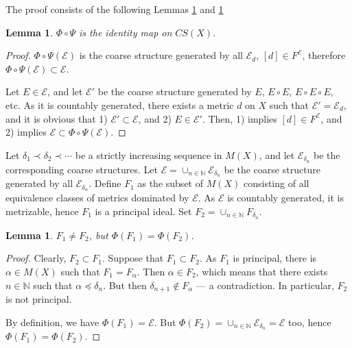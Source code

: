 \documentclass[reqno,12pt]{amsart}
\theoremstyle{plain}%
\newtheorem{lem}[thm]{Lemma}
\theoremstyle{definition}
\theoremstyle{remark}
\numberwithin{equation}{section}
\begin{document}
The proof consists of the following Lemmas \ref{L4} and \ref{L5}

\begin{lem}\label{L4}
$\Phi\circ\Psi$ is the identity map on $CS(X)$.

\end{lem}
\begin{proof}
$\Phi\circ\Psi(\mathcal E)$ is the coarse structure generated by all $\mathcal E_d$, $[d]\in F^\mathcal E$, therefore $\Phi\circ\Psi(\mathcal E)\subset\mathcal E$.
     
Let $E\in\mathcal E$, and let $\mathcal E'$ be the coarse structure generated by $E$, $E\circ E$, $E\circ E\circ E$, etc. As it is countably generated, there exists a metric $d$ on $X$ such that $\mathcal E'=\mathcal E_d$, and it is obvious that 1) $\mathcal E'\subset\mathcal E$, and 2) $E\in\mathcal E'$. Then, 1) implies $[d]\in F^\mathcal E$, and 2) implies $\mathcal E\subset\Phi\circ\Psi(\mathcal E)$.
\end{proof} 


Let $\delta_1\prec\delta_2\prec\cdots$ be a strictly increasing sequence in $M(X)$, and let $\mathcal E_{\delta_n}$ be the corresponding coarse structures. Let $\mathcal E=\cup_{n\in\mathbb N}\mathcal E_{\delta_n}$ be the coarse structure generated by all $\mathcal E_{\delta_n}$. Define $F_1$ as the subset of $M(X)$ consisting of all equivalence classes of metrics dominated by $\mathcal E$. As $\mathcal E$ is countably generated, it is metrizable, hence $F_1$ is a principal ideal.
Set $F_2=\cup_{n\in\mathbb N}F_{\delta_n}$. 

\begin{lem}\label{L5}
$F_1\neq F_2$, but $\Phi(F_1)=\Phi(F_2)$.

\end{lem}
\begin{proof}
Clearly, $F_2\subset F_1$. Suppose that $F_1\subset F_2$. As $F_1$ is principal, there is $\alpha\in M(X)$ such that $F_1=F_\alpha$. Then $\alpha\in F_2$, which means that there exists $n\in\mathbb N$ such that $\alpha\preceq\delta_n$. But then $\delta_{n+1}\notin F_\alpha$ --- a contradiction. In particular, $F_2$ is not principal.

By definition, we have $\Phi(F_1)=\mathcal E$. But $\Phi(F_2)=\cup_{n\in\mathbb N}\mathcal E_{\delta_n}=\mathcal E$ too, hence $\Phi(F_1)=\Phi(F_2)$. 
\end{proof}
\end{document}
